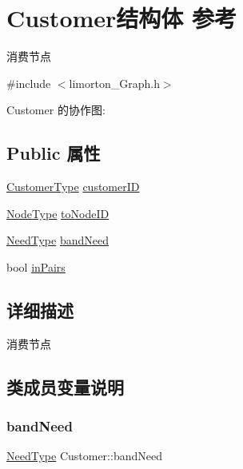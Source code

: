 \hypertarget{struct_customer}{}\section{Customer结构体 参考}
\label{struct_customer}


消费节点  




{\ttfamily \#include $<$limorton\+\_\+\+Graph.\+h$>$}



Customer 的协作图\+:
\subsection*{Public 属性}
\begin{DoxyCompactItemize}
\item 
\hyperlink{limorton___graph_8h_ad078283245fcc340f88e58ec4c9243b3}{Customer\+Type} \hyperlink{struct_customer_a6a36ab5abc6d6e2340dd07443034778d}{customer\+ID}
\item 
\hyperlink{limorton___graph_8h_a1b1a96beadaa686056e47989bf2a037e}{Node\+Type} \hyperlink{struct_customer_a709de116d5bd92decf3f2cfddd3a7a45}{to\+Node\+ID}
\item 
\hyperlink{limorton___graph_8h_a86b0653fa2bba76fcca4a7562dc60d30}{Need\+Type} \hyperlink{struct_customer_accd86ad4d349a5c247d3bf3fcd1198c7}{band\+Need}
\item 
bool \hyperlink{struct_customer_a8747b65630d2b105031db444169a7bc2}{in\+Pairs}
\end{DoxyCompactItemize}


\subsection{详细描述}
消费节点 

\subsection{类成员变量说明}
\mbox{\label{struct_customer_accd86ad4d349a5c247d3bf3fcd1198c7}} 
\subsubsection{\texorpdfstring{band\+Need}{bandNeed}}
{\footnotesize\ttfamily \hyperlink{limorton___graph_8h_a86b0653fa2bba76fcca4a7562dc60d30}{Need\+Type} Customer\+::band\+Need}

